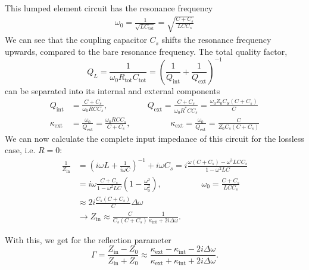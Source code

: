 This lumped element circuit has the resonance frequency
\begin{align}
\omega_0 = \frac{1}{\sqrt{LC_\mathrm{tot}}} = \sqrt{\frac{C+C_s}{L C C_s}}
\end{align}
We can see that the coupling capacitor $C_s$ shifts the resonance frequency upwards, compared to the bare resonance frequency.
The total quality factor,
\begin{equation}
Q_L = \frac{1}{\omega_0 R_\mathrm{tot}C_\mathrm{tot}} = \left(\frac{1}{Q_\mathrm{int}} + \frac{1}{Q_\mathrm{ext}}\right)^{-1}
\end{equation}
can be separated into its internal and external components
\begin{align}
Q_\mathrm{int} &= \frac{C+C_s}{\omega_0 R C C_s}, \hspace{2cm} Q_\mathrm{ext} = \frac{C+C_s}{\omega_0 R^* C C_s} = \frac{\omega_0 Z_0 C_S (C+C_s)}{C} \\%
\kappa_\mathrm{ext} &= \frac{\omega_0}{Q_\mathrm{ext}} = \frac{\omega_0 R C C_s}{C+C_s}, \hspace{2cm} \kappa_\mathrm{ext} = \frac{\omega_0}{Q_\mathrm{ext}} = \frac{C}{Z_0 C_s (C+C_s)}
\end{align}
We can now calculate the complete input impedance of this circuit for the lossless case, i.e. $R=0$:
\begin{align}
\frac{1}{Z_\mathrm{in}}&=\left(i\omega L + \frac{1}{i\omega C}\right)^{-1} + i\omega C_s = i\frac{\omega(C+C_s)-\omega^3LCC_s}{1-\omega^2LC} \\%
&=i\omega\frac{C+C_s}{1-\omega^2LC}\left(1-\frac{\omega^2}{\omega_0^2}\right), \hspace{2cm} \omega_0=\frac{C+C_s}{LCC_s} \\%
&\approx2i\frac{C_s(C+C_s)}{C}\Delta\omega \\%
&\longrightarrow Z_\mathrm{in} \approx \frac{C}{C_s (C+C_s)}\frac{1}{\kappa_\mathrm{int}+2i\Delta\omega}.
\end{align}

With this, we get for the reflection parameter
\begin{equation}
\Gamma = \frac{Z_\mathrm{in}-Z_0}{Z_\mathrm{in}+Z_0}\approx\frac{\kappa_\mathrm{ext}-\kappa_\mathrm{int}-2i\Delta\omega}{\kappa_\mathrm{ext}+\kappa_\mathrm{int}+2i\Delta\omega}.
\end{equation}